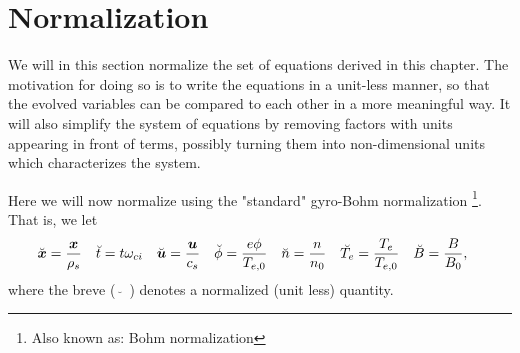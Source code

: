 \section{Normalization}
\label{sec:norm}
We will in this section normalize the set of equations derived in this chapter.
The motivation for doing so is to write the equations in a unit-less manner, so that the evolved variables can be compared to each other in a more meaningful way.
It will also simplify the system of equations by removing factors with units appearing in front of terms, possibly turning them into non-dimensional units which characterizes the system.

Here we will now normalize using the "standard" gyro-Bohm normalization%
%
\footnote{Also known as: Bohm normalization}.%
%
That is, we let
%
\begin{align*}
    &\breve{\boldsymbol{x}} = \frac{\boldsymbol{x}}{\rho_s}&
    &\breve{t}      = t\omega_{ci}&
    &\breve{\boldsymbol{u}} = \frac{\boldsymbol{u}}{c_s}&
    &\breve{\phi}   = \frac{e\phi}{T_{e,0}}&
    &\breve{n}      = \frac{n}{n_{0}}&
    &\breve{T_e}    = \frac{T_e}{T_{e,0}}&
    &\breve{B}      = \frac{B}{B_0},&
\end{align*}
%
where the breve ($\breve{\quad}$) denotes a normalized (unit less) quantity.

